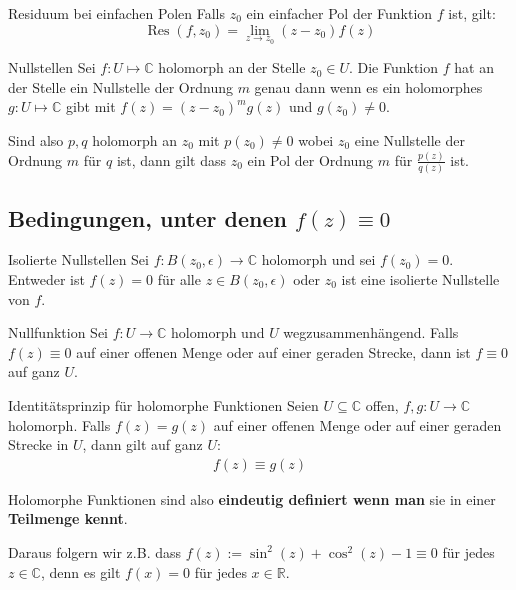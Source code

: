 \documentclass[a4paper,10pt]{article}
\DeclareMathOperator{\Res}{Res}
\def\R{\mathbb{R}}
\def\C{\mathbb{C}}
\begin{document}
\begin{subbox}{Residuum bei einfachen Polen}
  Falls $z_0$ ein einfacher Pol der Funktion $f$ ist, gilt:
  $$
    \Res(f, z_0) = \lim_{z \to z_0} (z - z_0) f(z)
  $$
\end{subbox}

\begin{subbox}{Nullstellen}
  Sei $f: U \mapsto \C$ holomorph an der Stelle $z_0 \in U$. Die Funktion $f$ hat an der Stelle ein Nullstelle der Ordnung $m$ genau dann wenn es ein holomorphes $g: U \mapsto \C$ gibt mit $f(z) = (z - z_0)^m g(z)$ und $g(z_0) \neq 0$. 
\end{subbox}

Sind also $p,q$ holomorph an $z_0$ mit $p(z_0) \neq 0$ wobei $z_0$ eine Nullstelle der Ordnung $m$ für $q$ ist, dann gilt dass $z_0$ ein Pol der Ordnung $m$ für $\frac{p(z)}{q(z)}$ ist.

\subsection{Bedingungen, unter denen $f(z) \equiv 0$}

\begin{mainbox}{Isolierte Nullstellen}
  Sei \(f\colon B(z_0,\epsilon)\to\mathbb{C}\) holomorph und sei \(f(z_0)=0\). Entweder ist \(f(z) = 0\) für alle \(z \in B(z_0,\epsilon)\) oder \(z_0\) ist eine isolierte Nullstelle von \(f\).
\end{mainbox}

\begin{subbox}{Nullfunktion}
  Sei \(f\colon U\to \mathbb{C}\) holomorph und \(U\) wegzusammenhängend. Falls \(f(z)\equiv0\) auf einer offenen Menge oder auf einer geraden Strecke, dann ist \(f\equiv0\) auf ganz \(U\).
\end{subbox}

\begin{mainbox}{Identitätsprinzip für holomorphe Funktionen}
  Seien \(U\subseteq \mathbb{C}\) offen, \(f,g \colon U \to \mathbb{C}\) holomorph. Falls \(f(z) = g(z)\) auf einer offenen Menge oder auf einer geraden Strecke in \(U\), dann gilt auf ganz $U$: \begin{align*}f(z)\equiv g(z)\end{align*}
\end{mainbox}

Holomorphe Funktionen sind also \textbf{eindeutig definiert wenn man} sie in einer \textbf{Teilmenge kennt}.

Daraus folgern wir z.B. dass $f(z) := \sin^2(z) + \cos^2(z) - 1 \equiv 0$ für jedes $z \in \C$, denn es gilt $f(x) = 0$ für jedes $x \in \R$.
\end{document}
